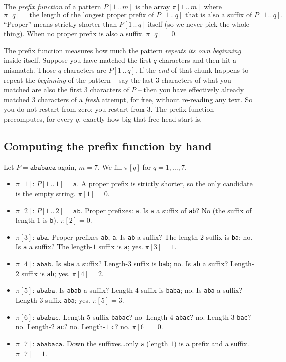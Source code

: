 \begin{definition}
\label{ch31:def-prefix}
The \emph{prefix function} of a pattern $P[1\,..\,m]$ is the array
$\pi[1\,..\,m]$ where
\[
  \pi[q] = \text{the length of the longest proper prefix of } P[1\,..\,q]
  \text{ that is also a suffix of } P[1\,..\,q].
\]
``Proper'' means strictly shorter than $P[1\,..\,q]$ itself (so we never pick the
whole thing). When no proper prefix is also a suffix, $\pi[q] = 0$.
\end{definition}

\begin{intuitionbox}
The prefix function measures how much the pattern \emph{repeats its own
beginning} inside itself. Suppose you have matched the first $q$ characters and
then hit a mismatch. Those $q$ characters are $P[1\,..\,q]$. If the \emph{end} of
that chunk happens to repeat the \emph{beginning} of the pattern -- say the
last $3$ characters of what you matched are also the first $3$ characters of $P$
-- then you have effectively already matched $3$ characters of a \emph{fresh}
attempt, for free, without re-reading any text. So you do not restart from zero;
you restart from $3$. The prefix function precomputes, for every $q$, exactly how
big that free head start is.
\end{intuitionbox}

\subsection{Computing the prefix function by hand}

Let $P = \texttt{ababaca}$ again, $m=7$. We fill $\pi[q]$ for $q=1,\ldots,7$.

\begin{itemize}
\item $\pi[1]$: $P[1\,..\,1]=\texttt{a}$. A proper prefix is strictly shorter, so
the only candidate is the empty string. $\pi[1]=0$.
\item $\pi[2]$: $P[1\,..\,2]=\texttt{ab}$. Proper prefixes: \texttt{a}. Is
\texttt{a} a suffix of \texttt{ab}? No (the suffix of length $1$ is \texttt{b}).
$\pi[2]=0$.
\item $\pi[3]$: $\texttt{aba}$. Proper prefixes \texttt{ab}, \texttt{a}. Is
\texttt{ab} a suffix? The length-$2$ suffix is \texttt{ba}; no. Is \texttt{a} a
suffix? The length-$1$ suffix is \texttt{a}; yes. $\pi[3]=1$.
\item $\pi[4]$: $\texttt{abab}$. Is \texttt{aba} a suffix? Length-$3$ suffix is
\texttt{bab}; no. Is \texttt{ab} a suffix? Length-$2$ suffix is \texttt{ab};
yes. $\pi[4]=2$.
\item $\pi[5]$: $\texttt{ababa}$. Is \texttt{abab} a suffix? Length-$4$ suffix is
\texttt{baba}; no. Is \texttt{aba} a suffix? Length-$3$ suffix \texttt{aba};
yes. $\pi[5]=3$.
\item $\pi[6]$: $\texttt{ababac}$. Length-$5$ suffix \texttt{babac}? no.
Length-$4$ \texttt{abac}? no. Length-$3$ \texttt{bac}? no. Length-$2$
\texttt{ac}? no. Length-$1$ \texttt{c}? no. $\pi[6]=0$.
\item $\pi[7]$: $\texttt{ababaca}$. Down the suffixes\ldots only \texttt{a}
(length $1$) is a prefix and a suffix. $\pi[7]=1$.
\end{itemize}


